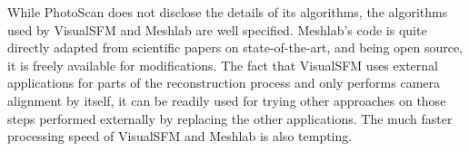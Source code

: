 While PhotoScan does not disclose the details of its algorithms, the algorithms used by VisualSFM and Meshlab are well specified.
Meshlab's code is quite directly adapted from scientific papers on state-of-the-art, and being open source, it is freely available for modifications.
The fact that VisualSFM uses external applications for parts of the reconstruction process and only performs camera alignment by itself, it can be readily used for trying other approaches on those steps performed externally by replacing the other applications.
The much faster processing speed of VisualSFM and Meshlab is also tempting.

